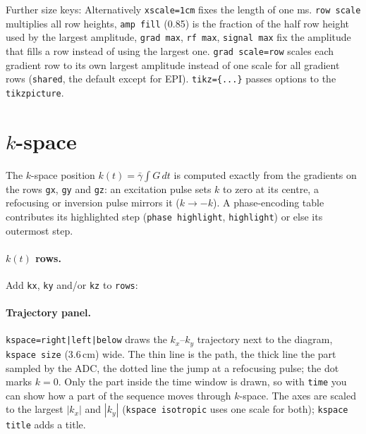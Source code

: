 \documentclass[11pt]{article}
\newcommand\key[1]{\texttt{#1}}
\begin{document}
Further size keys: Alternatively \key{xscale=1cm} fixes the length of one ms.
\key{row scale} multiplies all row heights, \key{amp fill} (0.85) is the
fraction of the half row height used by the largest amplitude, \key{grad max},
\key{rf max}, \key{signal max} fix the amplitude that fills a row instead of
using the largest one. \key{grad scale=row} scales each gradient row to its own
largest amplitude instead of one scale for all gradient rows (\key{shared}, the
default except for EPI). \key{tikz=\{...\}} passes options to the
\texttt{tikzpicture}.

\section{\texorpdfstring{$k$}{k}-space}\label{sec:kspace}
The $k$-space position $k(t) = \bar\gamma\int G\,dt$ is computed exactly from
the gradients on the rows \texttt{gx}, \texttt{gy} and \texttt{gz}: an
excitation pulse sets $k$ to zero at its centre, a refocusing or inversion pulse
mirrors it ($k\to-k$). A phase-encoding table contributes its highlighted step
(\key{phase highlight}, \key{highlight}) or else its outermost step.

\paragraph{$k(t)$ rows.} Add \texttt{kx}, \texttt{ky} and/or \texttt{kz} to
\key{rows}:
\begin{example}
\GradientEchoDiagram[rows={rf,gy,gx,kx,ky}, phase highlight=0.5]
\end{example}

\paragraph{Trajectory panel.} \key{kspace=right|left|below} draws the
$k_x$--$k_y$ trajectory next to the diagram, \key{kspace size} (3.6\,cm) wide.
The thin line is the path, the thick line the part sampled by the ADC, the
dotted line the jump at a refocusing pulse; the dot marks $k=0$. Only the part
inside the time window is drawn, so with \key{time} you can show how a part of
the sequence moves through $k$-space. The axes are scaled to the largest
$|k_x|$ and $|k_y|$ (\key{kspace isotropic} uses one scale for both);
\key{kspace title} adds a title.
\begin{example}
\SpinEchoDiagram[rows={rf,gz,gy,gx}, kspace=left, phase highlight=0.75]
\end{example}
\end{document}
